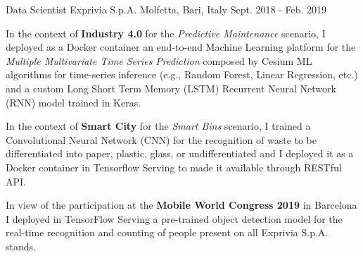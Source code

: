 \begin{cventries}
  \cventry
    {Data Scientist} %
    {Exprivia S.p.A.} %
    {Molfetta, Bari, Italy} %
    {Sept. 2018 - Feb. 2019} %
    {   
      \begin{cvitems} %
        \item {In the context of \textbf{Industry 4.0} for the \textit{Predictive Maintenance} scenario, I deployed as a Docker container an end-to-end Machine Learning platform for the \textit{Multiple Multivariate Time Series Prediction} composed by Cesium ML algorithms for time-series inference (e.g., Random Forest, Linear Regression, etc.) and a custom Long Short Term Memory (LSTM) Recurrent Neural Network (RNN) model trained in Keras.}
        \item {In the context of \textbf{Smart City} for the \textit{Smart Bins} scenario, I trained a Convolutional Neural Network (CNN) for the recognition of waste to be differentiated into paper, plastic, glass, or undifferentiated and I deployed it as a Docker container in Tensorflow Serving to made it available through RESTful API.}
        \item {In view of the participation at the \textbf{Mobile World Congress 2019} in Barcelona I deployed in TensorFlow Serving a pre-trained object detection model for the real-time recognition and counting of people present on all Exprivia S.p.A. stands.}
      \end{cvitems}
    }

\end{cventries}
